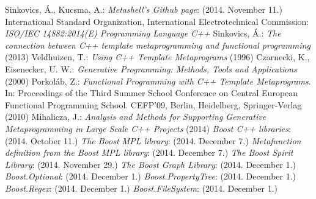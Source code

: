 
\begin{thebibliography}{99}
    Sinkovics, Á., Kucsma, A.:
    \textit{Metashell's Github page}:
     (2014. November 11.)
    International Standard Organization, International Electrotechnical
    Commission: \textit{ISO/IEC 14882:2014(E) Programming Language C++}
    Sinkovics, Á.:
    \textit{The connection between C++ template metaprogramming and functional
    programming} (2013)
    Veldhuizen, T.:
    \textit{ Using C++ Template Metaprograms} (1996)
    Czarnecki, K., Eisenecker, U. W.:
    \textit{Generative Programming: Methods, Tools and Applications} (2000)
    Porkoláb, Z.:
    \textit{Functional Programming with C++ Template Metaprograms}.
    In: Proceedings of the Third Summer School Conference on
    Central European Functional Programming School. CEFP’09, Berlin,
    Heidelberg, Springer-Verlag (2010)
    Mihalicza, J.:
    \textit{Analysis and Methods for Supporting Generative Metaprogramming in
    Large Scale C++ Projects} (2014)
    \textit{Boost C++ libraries}:
     (2014. October 11.)
    \textit{The Boost MPL library}:
    (2014. December 7.)
    \textit{Metafunction definition from the Boost MPL library}:
    (2014. December 7.)
    \textit{The Boost Spirit Library}:
     (2014. November 29.)
    \textit{The Boost Graph Library}:
    (2014. December 1.)
    \textit{Boost.Optional}:
    (2014. December 1.)
    \textit{Boost.PropertyTree}:
    (2014. December 1.)
    \textit{Boost.Regex}:
    (2014. December 1.)
    \textit{Boost.FileSystem}:
    (2014. December 1.)

\end{thebibliography}
